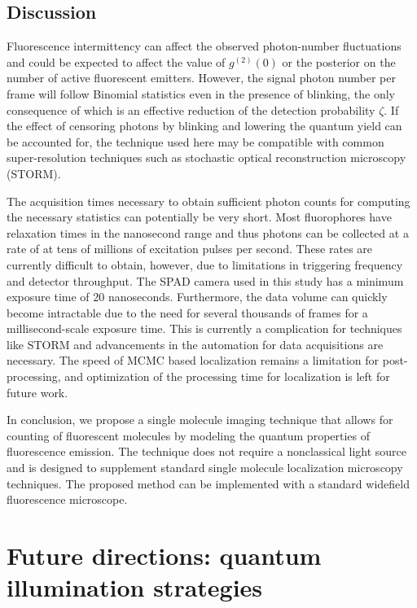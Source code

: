 \subsection{Discussion}

Fluorescence intermittency can affect the observed photon-number fluctuations and could be expected to affect the value of $g^{(2)}(0)$ or the posterior on the number of active fluorescent emitters. However, the signal photon number per frame will follow Binomial statistics even in the presence of blinking, the only consequence of which is an effective reduction of the detection probability $\zeta$. If the effect of censoring photons by blinking and lowering the quantum yield can be accounted for, the technique used here may be compatible with common super-resolution techniques such as stochastic optical reconstruction microscopy (STORM). 

The acquisition times necessary to obtain sufficient photon counts for computing the necessary statistics can potentially be very short. Most fluorophores have relaxation times in the nanosecond range and thus photons can be collected at a rate of at tens of millions of excitation pulses per second. These rates are currently difficult to obtain, however, due to limitations in triggering frequency and detector throughput. The SPAD camera used in this study has a minimum exposure time of 20 nanoseconds. Furthermore, the data volume can quickly become intractable due to the need for several thousands of frames for a millisecond-scale exposure time. This is currently a complication for techniques like STORM and advancements in the automation for data acquisitions are necessary. The speed of MCMC based localization remains a limitation for post-processing, and optimization of the processing time for localization is left for future work. 

In conclusion, we propose a single molecule imaging technique that allows for counting of fluorescent molecules by modeling the quantum properties of fluorescence emission. The technique does not require a nonclassical light source and is designed to supplement standard single molecule localization microscopy techniques. The proposed method can be implemented with a standard widefield fluorescence microscope.

\section{Future directions: quantum illumination strategies}


